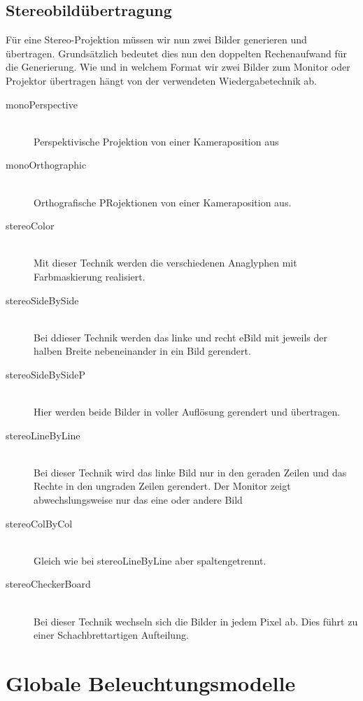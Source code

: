 \documentclass[10pt]{article}
\begin{document}
\subsection{Stereobildübertragung}
Für eine Stereo-Projektion müssen wir nun zwei Bilder generieren und übertragen. Grundsätzlich bedeutet dies nun den doppelten Rechenaufwand für die Generierung. Wie und in welchem Format wir zwei Bilder zum Monitor oder Projektor übertragen hängt von der verwendeten Wiedergabetechnik ab.
\begin{description}
	\item[monoPerspective] \hfill \\
		Perspektivische Projektion von einer Kameraposition aus
	\item[monoOrthographic] \hfill \\
		Orthografische PRojektionen von einer Kameraposition aus.
	\item[stereoColor] \hfill \\
		Mit dieser Technik werden die verschiedenen Anaglyphen mit Farbmaskierung realisiert.
	\item[stereoSideBySide] \hfill \\
		Bei ddieser Technik werden das linke und recht eBild mit jeweils der halben Breite nebeneinander in ein Bild gerendert.
	\item[stereoSideBySideP] \hfill \\
		Hier werden beide Bilder in voller Auflösung gerendert und übertragen.
	\item[stereoLineByLine] \hfill \\
		Bei dieser Technik wird das linke Bild nur in den geraden Zeilen und das Rechte in den ungraden Zeilen gerendert. Der Monitor zeigt abwechslungsweise nur das eine oder andere Bild
	\item[stereoColByCol] \hfill \\
		Gleich wie bei stereoLineByLine aber spaltengetrennt.
	\item[stereoCheckerBoard] \hfill \\
		Bei dieser Technik wechseln sich die Bilder in jedem Pixel ab. Dies führt zu einer Schachbrettartigen Aufteilung.
\end{description}

\newpage
\section{Globale Beleuchtungsmodelle}
\end{document}
